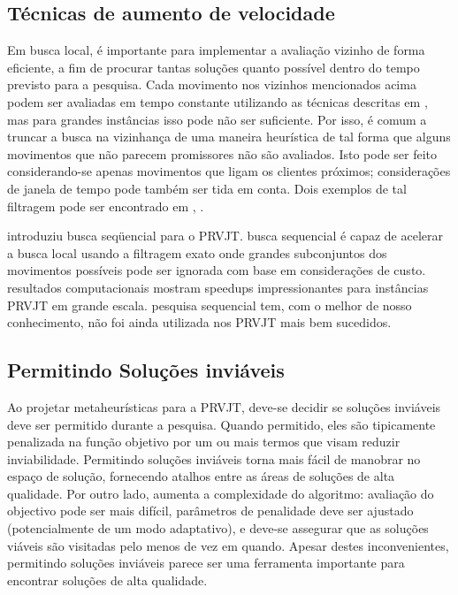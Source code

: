  
 \subsection{Técnicas de aumento de velocidade}
 
 Em busca local, é importante para implementar a avaliação vizinho de forma eficiente, a fim de procurar tantas soluções quanto possível dentro do tempo previsto para a pesquisa. Cada movimento nos vizinhos mencionados acima podem ser avaliadas em tempo constante utilizando as técnicas descritas em \cite{kindervater97}, mas para grandes instâncias isso pode não ser suficiente. Por isso, é comum a truncar a busca na vizinhança de uma maneira heurística de tal forma que alguns movimentos que não parecem promissores não são avaliados. Isto pode ser feito considerando-se apenas movimentos que ligam os clientes próximos; considerações de janela de tempo pode também ser tida em conta. Dois exemplos de tal filtragem pode ser encontrado em \cite{uno00} , \cite{nagata10}.
 
 \cite{daniel14} introduziu busca seqüencial para o PRVJT. busca sequencial é capaz de acelerar a busca local usando a filtragem exato onde grandes subconjuntos dos movimentos possíveis pode ser ignorada com base em considerações de custo. resultados computacionais mostram speedups impressionantes para instâncias PRVJT em grande escala. pesquisa sequencial tem, com o melhor de nosso conhecimento, não foi ainda utilizada nos PRVJT mais bem sucedidos.
 
 
 \subsection{Permitindo Soluções inviáveis}
 
Ao projetar metaheurísticas para a PRVJT, deve-se decidir se soluções inviáveis deve ser permitido durante a pesquisa. Quando permitido, eles são tipicamente penalizada na função objetivo por um ou mais termos que visam reduzir inviabilidade. Permitindo soluções inviáveis torna mais fácil de manobrar no espaço de solução, fornecendo atalhos entre as áreas de soluções de alta qualidade. Por outro lado, aumenta a complexidade do algoritmo: avaliação do objectivo pode ser mais difícil, parâmetros de penalidade deve ser ajustado (potencialmente de um modo adaptativo), e deve-se assegurar que as soluções viáveis são visitadas pelo menos de vez em quando. Apesar destes inconvenientes, permitindo soluções inviáveis parece ser uma ferramenta importante para encontrar soluções de alta qualidade.
 
